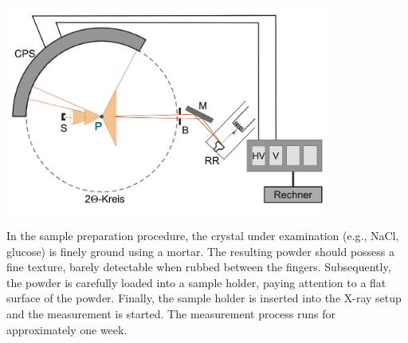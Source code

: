 \begin{center}
    \captionsetup{type = figure}
    \includegraphics[width = 0.8\textwidth]{Pictures/SetupDiff.png}
    \label{fig:setupdiff}
\end{center}

In the sample preparation procedure, the crystal under examination (e.g., NaCl, glucose) is finely ground using a mortar. The resulting powder should possess a fine texture, barely detectable when rubbed between the fingers. Subsequently, the powder is carefully loaded into a sample holder, paying attention to a flat surface of the powder. Finally, the sample holder is inserted into the X-ray setup and the measurement is started. The measurement process runs for
approximately one week.  \cite{Anleitung}